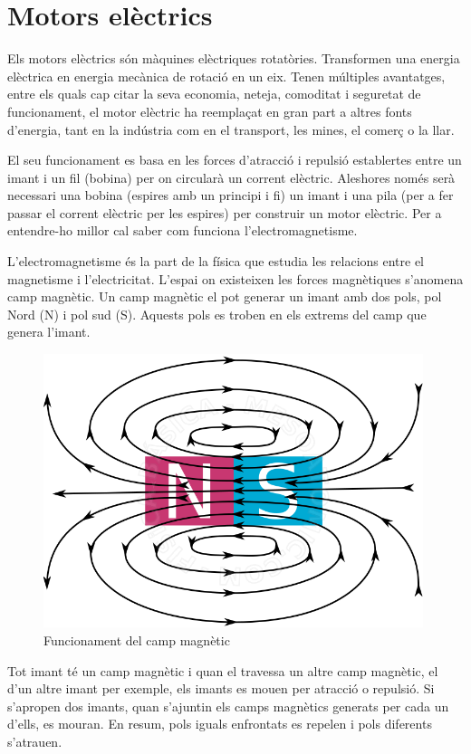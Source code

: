 \section{Motors elèctrics}
Els motors elèctrics són màquines elèctriques rotatòries. Transformen una energia elèctrica en energia mecànica de rotació en un eix. Tenen múltiples avantatges, entre els quals cap citar la seva economia, neteja, comoditat i seguretat de funcionament, el motor elèctric ha reemplaçat en gran part a altres fonts d’energia, tant en la indústria com en el transport, les mines, el comerç o la llar.

El seu funcionament es basa en les forces d’atracció i repulsió establertes entre un imant i un fil (bobina) per on circularà un corrent elèctric. Aleshores només serà necessari una bobina (espires amb un principi i fi) un imant i una pila (per a fer passar el corrent elèctric per les espires) per construir un motor elèctric. Per a entendre-ho millor cal saber com funciona l'electromagnetisme.

L'electromagnetisme és la part de la física que estudia les relacions entre el magnetisme i l'electricitat. L'espai on existeixen les forces magnètiques s'anomena camp magnètic. Un camp magnètic el pot generar un imant amb dos pols, pol Nord (N) i pol sud (S). Aquests pols es troben en els extrems del camp que genera l’imant.

\begin{figure}[H]
		\centering
    	\includegraphics[width=\textwidth, height=8cm]{Motors/campomagnetico.png}
     	\caption{Funcionament del camp magnètic} 
\end{figure}

Tot imant té un camp magnètic i quan el travessa un altre camp magnètic, el d’un altre imant per exemple, els imants es mouen per atracció o repulsió. Si s’apropen dos imants, quan s'ajuntin els camps magnètics generats per cada un d’ells, es mouran. En resum, pols iguals enfrontats es repelen i pols diferents s’atrauen.


